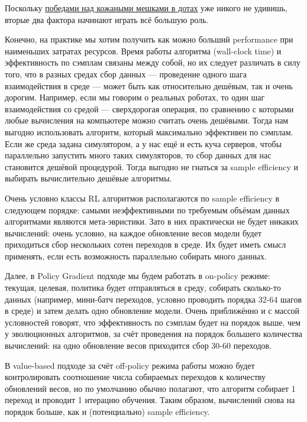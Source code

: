\begin{remark}Поскольку \href{https://openai.com/projects/five/}{победами над кожаными мешками в дотах} уже никого не удивишь, вторые два фактора начинают играть всё большую роль.
\end{remark}

Конечно, на практике мы хотим получить как можно больший performance при наименьших затратах ресурсов. Время работы алгоритма (wall-clock time) и эффективность по сэмплам связаны между собой, но их следует различать в силу того, что в разных средах сбор данных --- проведение одного шага взаимодействия в среде --- может быть как относительно дешёвым, так и очень дорогим. Например, если мы говорим о реальных роботах, то один шаг взаимодействия со средой --- сверхдорогая операция, по сравнению с которыми любые вычисления на компьютере можно считать очень дешёвыми. Тогда нам выгодно использовать алгоритм, который максимально эффективен по сэмплам. Если же среда задана симулятором, а у нас ещё и есть куча серверов, чтобы параллельно запустить много таких симуляторов, то сбор данных для нас становится дешёвой процедурой. Тогда выгодно не гнаться за sample efficiency и выбирать вычислительно дешёвые алгоритмы.

Очень условно классы RL алгоритмов располагаются по sample efficiency в следующем порядке: самыми неэффективными по требуемым объёмам данных алгоритмами являются мета-эвристики. Зато в них практически не будет никаких вычислений: очень условно, на каждое обновление весов модели будет приходиться сбор нескольких сотен переходов в среде. Их будет иметь смысл применять, если есть возможность параллельно собирать много данных. 

Далее, в Policy Gradient подходе мы будем работать в on-policy режиме: текущая, целевая, политика будет отправляться в среду, собирать сколько-то данных (например, мини-батч переходов, условно проводить порядка 32-64 шагов в среде) и затем делать одно обновление модели. Очень приближённо и с массой условностей говорят, что эффективность по сэмплам будет на порядок выше, чем у эволюционных алгоритмов, за счёт проведения на порядок большего количества вычислений: на одно обновление весов приходится сбор 30-60 переходов.

В value-based подходе за счёт off-policy режима работы можно будет контролировать соотношение числа собираемых переходов к количеству обновлений весов, но по умолчанию обычно полагают, что алгоритм собирает 1 переход и проводит 1 итерацию обучения. Таким образом, вычислений снова на порядок больше, как и (потенциально) sample efficiency.

